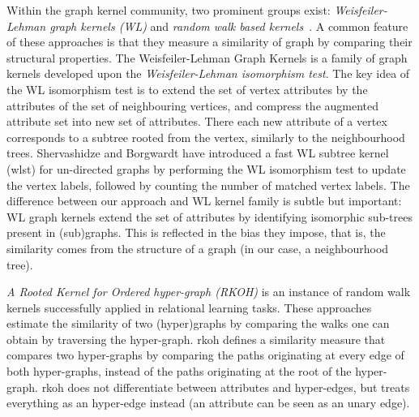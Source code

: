 Within the graph kernel community, two prominent groups exist:  \textit{Weisfeiler-Lehman graph kernels (WL)} \cite{Shervashidze2011,shervashidze09fastsubtree,FrasconiCRG14,haussler99convolution,ICPR2014BaiRH}  and \textit{random walk based kernels}~\cite{WachmanK07,Lovasz1996}.
A common feature of these approaches is that they measure a similarity of graph by comparing their structural properties.
The Weisfeiler-Lehman Graph Kernels is a family of graph kernels developed upon the \textit{Weisfeiler-Lehman isomorphism test}.
The key idea of the WL isomorphism test is to extend the set of vertex attributes by the attributes of the set of neighbouring vertices, and compress the augmented attribute set into new set of attributes.
There each new attribute of a vertex corresponds to a subtree rooted from the vertex, similarly to the neighbourhood trees.
Shervashidze and Borgwardt have introduced a fast WL subtree kernel (\gls{wlst}) \cite{shervashidze09fastsubtree} for un-directed graphs by performing the WL isomorphism test to update the vertex labels, followed by counting the number of matched vertex labels.
The difference between our approach and WL kernel family is subtle but important: WL graph kernels extend the set of attributes by identifying isomorphic sub-trees present in (sub)graphs.
This is reflected in the bias they impose, that is, the similarity comes from the structure of a graph (in our case, a neighbourhood tree).


\textit{A Rooted Kernel for Ordered hyper-graph (RKOH)} \cite{WachmanK07} is an instance of random walk kernels successfully applied in relational learning tasks.
These approaches estimate the similarity of two (hyper)graphs by comparing the walks one can obtain by traversing the hyper-graph.
\gls{rkoh} defines a similarity measure that compares two hyper-graphs by comparing the paths originating at every edge of both hyper-graphs, instead of the paths originating at the root of the hyper-graph.
\gls{rkoh} does not differentiate between attributes and hyper-edges, but treats everything as an hyper-edge instead (an attribute can be seen as an unary edge).


